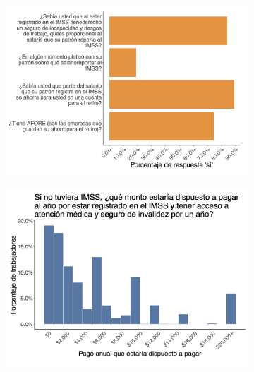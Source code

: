 \documentclass[oneside,11pt]{article}
\begin{document}
\begin{figure}[H]
    \caption{Worker Survey Graphs}
    \label{worker_survey_3}
    \begin{center}

    \begin{subfigure}{0.49\textwidth}
    \includegraphics[width=\textwidth]{04_Figures/worker_survey/Exp_13.png}
    \end{subfigure}
    \begin{subfigure}{0.49\textwidth}
    \includegraphics[width=\textwidth]{04_Figures/worker_survey/Exp_14.png}
    \end{subfigure}
    

\end{center}
\end{figure}
\end{document}
